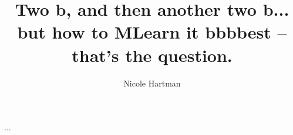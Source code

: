 \documentclass{report}
\begin{document}
\title{Two b, and then another two b... but how to MLearn it bbbbest -- that's the question.}
\author{Nicole Hartman}
 
%
%
%
%
%
%
%
%
%
%
%
%
%
%
%
%


%
%
%
%
%


...


\end{document}
